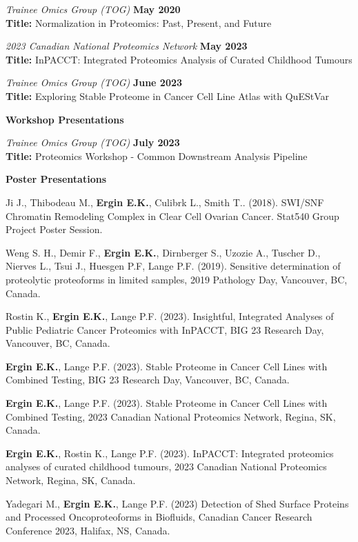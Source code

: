 \documentclass[margin,line]{res}
\begin{document}
\begin{resume}
\vspace{-.3cm}
{\em Trainee Omics Group (TOG)} \hfill {\bf May 2020}\\
{\bf Title:} Normalization in Proteomics: Past, Present, and Future

{\em 2023 Canadian National Proteomics Network} \hfill {\bf May 2023}\\
{\bf Title:} InPACCT: Integrated Proteomics Analysis of Curated Childhood Tumours

{\em Trainee Omics Group (TOG)} \hfill {\bf June 2023}\\
{\bf Title:} Exploring Stable Proteome in Cancer Cell Line Atlas with QuEStVar

{\bf Workshop Presentations}

\vspace{-.3cm}
{\em Trainee Omics Group (TOG)} \hfill {\bf July 2023}\\
{\bf Title:} Proteomics Workshop - Common Downstream Analysis Pipeline

{\bf Poster Presentations}

\vspace{-.3cm}
Ji J., Thibodeau M., {\bf Ergin E.K.}, Culibrk L., Smith T.. (2018). SWI/SNF Chromatin Remodeling Complex in Clear Cell Ovarian Cancer. Stat540 Group Project Poster Session.

Weng S. H., Demir F., {\bf Ergin E.K.}, Dirnberger S., Uzozie A., Tuscher D., Nierves L., Tsui J., Huesgen P.F, Lange P.F. (2019). Sensitive determination of proteolytic proteoforms in limited samples, 2019 Pathology Day, Vancouver, BC, Canada.

Rostin K., {\bf Ergin E.K.}, Lange P.F. (2023). Insightful, Integrated Analyses of Public Pediatric Cancer Proteomics with InPACCT, BIG 23 Research Day, Vancouver, BC, Canada.

{\bf Ergin E.K.}, Lange P.F. (2023). Stable Proteome in Cancer Cell Lines with Combined Testing, BIG 23 Research Day, Vancouver, BC, Canada.

{\bf Ergin E.K.}, Lange P.F. (2023). Stable Proteome in Cancer Cell Lines with Combined Testing, 2023 Canadian National Proteomics Network, Regina, SK, Canada.

{\bf Ergin E.K.}, Rostin K., Lange P.F. (2023). InPACCT: Integrated proteomics analyses of curated childhood tumours, 2023 Canadian National Proteomics Network, Regina, SK, Canada.

Yadegari M., {\bf Ergin E.K.}, Lange P.F. (2023) Detection of Shed Surface Proteins and Processed Oncoproteoforms in Biofluids, Canadian Cancer Research Conference 2023, Halifax, NS, Canada.


\end{resume}
\end{document}
